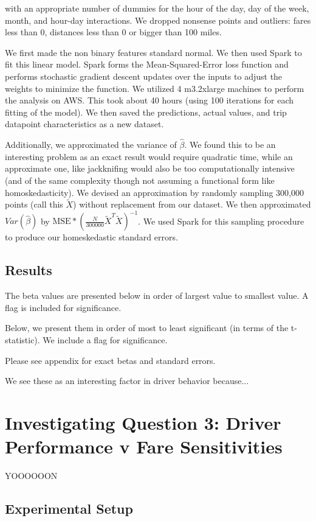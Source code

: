 \documentclass[twoside]{article}
\begin{document}
\begin{multicols}{2}
\noindent with an appropriate number of dummies for the hour of the day, day of the week, month, and hour-day interactions. We dropped nonsense points and outliers: fares less than 0, distances less than 0 or bigger than 100 miles. 

We first made the non binary features standard normal. We then used Spark to fit this linear model. Spark forms the Mean-Squared-Error loss function and performs stochastic gradient descent updates over the inputs to adjust the weights to minimize the function. We utilized 4 m3.2xlarge machines to perform the analysis on AWS. This took about 40 hours (using 100 iterations for each fitting of the model). We then saved the predictions, actual values, and trip datapoint characteristics as a new dataset. 

Additionally, we approximated the variance of $\hat{\beta}$. We found this to be an interesting problem as an exact result would require quadratic time, while an approximate one, like jackknifing would also be too computationally intensive (and of the same complexity though not assuming a functional form like homoskedasticity).  We devised an approximation by randomly sampling 300,000 points (call this $\tilde{X}$) without replacement from our dataset. We then approximated $Var(\hat{\beta})$ by $\text{MSE}*(\frac{N}{300000}\tilde{X}^T\tilde{X})^{-1}$. We used Spark for this sampling procedure to produce our homeskedastic standard errors. 
\subsection{Results}

The beta values are presented below in order of largest value to smallest value. A flag is included for significance.

Below, we present them in order of most to least significant (in terms of the t-statistic). We include a flag for significance.

Please see appendix for exact betas and standard errors.

We see these as an interesting factor in driver behavior because...

\section{Investigating Question 3: Driver Performance v Fare Sensitivities}
YOOOOOON
\subsection{Experimental Setup}

\end{multicols}
\end{document}
